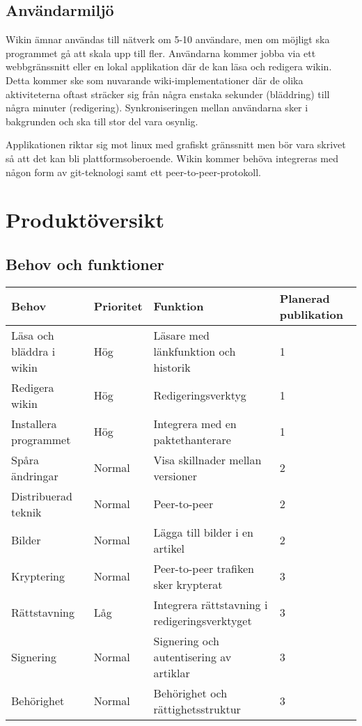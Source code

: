 \subsection{Användarmiljö}
Wikin ämnar användas till nätverk om 5-10 användare, men om möjligt ska programmet gå att skala upp till fler. Användarna kommer jobba via ett webbgränssnitt eller en lokal applikation där de kan läsa och redigera wikin. Detta kommer ske som nuvarande wiki-implementationer där de olika aktiviteterna oftast sträcker sig från några enstaka sekunder (bläddring) till några minuter (redigering). Synkroniseringen mellan användarna sker i bakgrunden och ska till stor del vara osynlig.

Applikationen riktar sig mot linux med grafiskt gränssnitt men bör vara skrivet så att det kan bli plattformsoberoende. Wikin kommer behöva integreras med någon form av git-teknologi samt ett peer-to-peer-protokoll.
\section{Produktöversikt}
\subsection*{Behov och funktioner}
\begin{tabular}{|l|l|l|l|}
\hline
Behov & Prioritet & Funktion & Planerad publikation \\
\hline
Läsa och bläddra i wikin & Hög & Läsare med länkfunktion och historik & 1 \\
\hline
Redigera wikin & Hög & Redigeringsverktyg & 1 \\
\hline
Installera programmet & Hög & Integrera med en paktethanterare & 1 \\
\hline
Spåra ändringar & Normal & Visa skillnader mellan versioner & 2 \\
\hline
Distribuerad teknik & Normal & Peer-to-peer & 2 \\
\hline 
Bilder & Normal & Lägga till bilder i en artikel & 2 \\
\hline
Kryptering & Normal & Peer-to-peer trafiken sker krypterat & 3 \\
\hline
Rättstavning & Låg & Integrera rättstavning i redigeringsverktyget & 3 \\
\hline	
Signering & Normal & Signering och autentisering av artiklar & 3 \\
\hline
Behörighet & Normal & Behörighet och rättighetsstruktur & 3 \\
\hline
\end{tabular}
